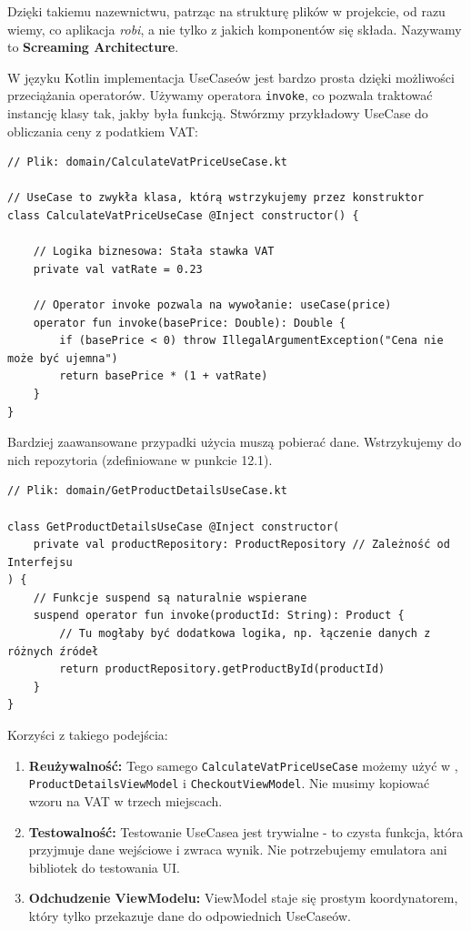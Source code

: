 Dzięki takiemu nazewnictwu, patrząc na strukturę plików w projekcie, od razu wiemy, co aplikacja \textit{robi}, a nie tylko z jakich komponentów się składa. Nazywamy to \textbf{Screaming Architecture}.

W języku Kotlin implementacja UseCaseów jest bardzo prosta dzięki możliwości przeciążania operatorów. Używamy operatora \texttt{invoke}, co pozwala traktować instancję klasy tak, jakby była funkcją. Stwórzmy przykładowy UseCase do obliczania ceny z podatkiem VAT:

\begin{verbatim}
// Plik: domain/CalculateVatPriceUseCase.kt

// UseCase to zwykła klasa, którą wstrzykujemy przez konstruktor
class CalculateVatPriceUseCase @Inject constructor() {

    // Logika biznesowa: Stała stawka VAT
    private val vatRate = 0.23 

    // Operator invoke pozwala na wywołanie: useCase(price)
    operator fun invoke(basePrice: Double): Double {
        if (basePrice < 0) throw IllegalArgumentException("Cena nie może być ujemna")
        return basePrice * (1 + vatRate)
    }
}
\end{verbatim}

Bardziej zaawansowane przypadki użycia muszą pobierać dane. Wstrzykujemy do nich repozytoria (zdefiniowane w punkcie 12.1).

\begin{verbatim}
// Plik: domain/GetProductDetailsUseCase.kt

class GetProductDetailsUseCase @Inject constructor(
    private val productRepository: ProductRepository // Zależność od Interfejsu
) {
    // Funkcje suspend są naturalnie wspierane
    suspend operator fun invoke(productId: String): Product {
        // Tu mogłaby być dodatkowa logika, np. łączenie danych z różnych źródeł
        return productRepository.getProductById(productId)
    }
}
\end{verbatim}

Korzyści z takiego podejścia:
\begin{enumerate}
    \item \textbf{Reużywalność:} Tego samego \texttt{CalculateVatPriceUseCase} możemy użyć w , \texttt{ProductDetailsViewModel} i \texttt{CheckoutViewModel}. Nie musimy kopiować wzoru na VAT w trzech miejscach.
    \item \textbf{Testowalność:} Testowanie UseCasea jest trywialne - to czysta funkcja, która przyjmuje dane wejściowe i zwraca wynik. Nie potrzebujemy emulatora ani bibliotek do testowania UI.
    \item \textbf{Odchudzenie ViewModelu:} ViewModel staje się prostym koordynatorem, który tylko przekazuje dane do odpowiednich UseCaseów.
\end{enumerate}


